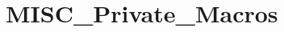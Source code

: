 \hypertarget{group___m_i_s_c___private___macros}{}\section{M\+I\+S\+C\+\_\+\+Private\+\_\+\+Macros}
\label{group___m_i_s_c___private___macros}

